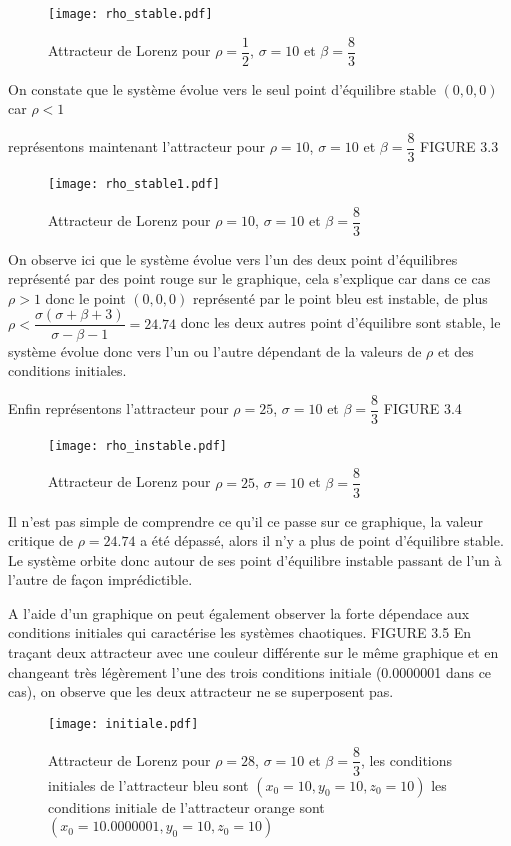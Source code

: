\begin{figure}
    \texttt{[image: rho\_stable.pdf]}
    \caption{Attracteur de Lorenz pour $\rho=\dfrac{1}{2}$, $\sigma=10$ et $\beta=\dfrac{8}{3}$} 
\end{figure}
On constate que le système évolue vers le seul point d'équilibre stable $(0,0,0)$ car $\rho<1$

représentons maintenant l'attracteur pour $\rho=10$, $\sigma=10$ et $\beta=\dfrac{8}{3}$ FIGURE 3.3

\begin{figure}
    \texttt{[image: rho\_stable1.pdf]}
    \caption{Attracteur de Lorenz pour $\rho=10$, $\sigma=10$ et $\beta=\dfrac{8}{3}$} 
\end{figure}

On observe ici que le système évolue vers l'un des deux point d'équilibres représenté par des point rouge sur le graphique, cela s'explique car dans ce cas $\rho>1$ donc le point $(0,0,0)$ représenté par le point bleu est instable, de plus $\rho < \dfrac{\sigma(\sigma+\beta+3)}{\sigma-\beta-1}=24.74$ donc les deux autres point d'équilibre sont stable, le système évolue donc vers l'un ou l'autre dépendant de la valeurs de $\rho$ et des conditions initiales.  

Enfin représentons l'attracteur pour $\rho=25$, $\sigma=10$ et $\beta=\dfrac{8}{3}$ FIGURE 3.4

\begin{figure}
    \texttt{[image: rho\_instable.pdf]}
    \caption{Attracteur de Lorenz pour $\rho=25$, $\sigma=10$ et $\beta=\dfrac{8}{3}$} 
\end{figure}

Il n'est pas simple de comprendre ce qu'il ce passe sur ce graphique, la valeur critique de $\rho=24.74$ a été dépassé, alors il n'y a plus de point d'équilibre stable. Le système orbite donc autour de ses point d'équilibre instable passant de l'un à l'autre de façon imprédictible.

A l'aide d'un graphique on peut également observer la forte dépendace aux conditions initiales qui caractérise les systèmes chaotiques. FIGURE 3.5 En traçant deux attracteur avec une couleur différente sur le même graphique et en changeant très légèrement l'une des trois conditions initiale (0.0000001 dans ce cas), on observe que les deux attracteur ne se superposent pas.

\begin{figure}
    \texttt{[image: initiale.pdf]}
    \caption{Attracteur de Lorenz pour $\rho=28$, $\sigma=10$ et $\beta=\dfrac{8}{3}$, les conditions initiales de l'attracteur bleu sont $(x_0=10,y_0=10,z_0=10)$ les conditions initiale de l'attracteur orange sont $(x_0=10.0000001,y_0=10,z_0=10)$} 
\end{figure}

